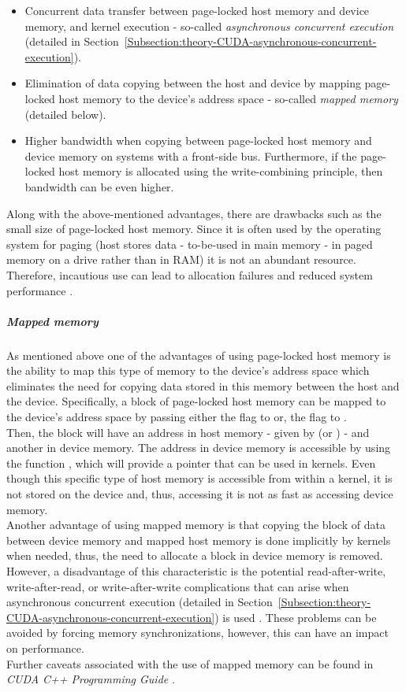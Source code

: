 \begin{itemize}
	\item Concurrent data transfer between page-locked host memory and device memory, and kernel execution - so-called \textit{asynchronous concurrent execution} (detailed in Section~\ref{Subsection:theory-CUDA-asynchronous-concurrent-execution}).
	\item Elimination of data copying between the host and device by mapping page-locked host memory to the device's address space - so-called \textit{mapped memory} (detailed below).
	\item Higher bandwidth when copying between page-locked host memory and device memory on systems with a front-side bus. Furthermore, if the page-locked host memory is allocated using the write-combining principle, then bandwidth can be even higher.
\end{itemize}

Along with the above-mentioned advantages, there are drawbacks such as the small size of page-locked host memory. Since it is often used by the operating system for paging (host stores data - to-be-used in main memory - in paged memory on a drive rather than in RAM) it is not an abundant resource. Therefore, incautious use can lead to allocation failures and reduced system performance \cite{NVIDIAMay2022}.

\subparagraph{Mapped memory}
As mentioned above one of the advantages of using page-locked host memory is the ability to map this type of memory to the device's address space which eliminates the need for copying data stored in this memory between the host and the device. Specifically, a block of page-locked host memory can be mapped to the device's address space by passing either the  flag to  or, the  flag to  \cite{NVIDIAMay2022}. \\
Then, the block will have an address in host memory - given by  (or ) - and another in device memory. The address in device memory is accessible by using the function , which will provide a pointer that can be used in kernels. Even though this specific type of host memory is accessible from within a kernel, it is not stored on the device and, thus, accessing it is not as fast as accessing device memory. \\
Another advantage of using mapped memory is that copying the block of data between device memory and mapped host memory is done implicitly by kernels when needed, thus, the need to allocate a block in device memory is removed. However, a disadvantage of this characteristic is the potential read-after-write, write-after-read, or write-after-write complications that can arise when asynchronous concurrent execution (detailed in Section~\ref{Subsection:theory-CUDA-asynchronous-concurrent-execution}) is used \cite{NVIDIAMay2022}. These problems can be avoided by forcing memory synchronizations, however, this can have an impact on performance. \\
Further caveats associated with the use of mapped memory can be found in \emph{CUDA C++ Programming Guide} \cite{NVIDIAMay2022}.

